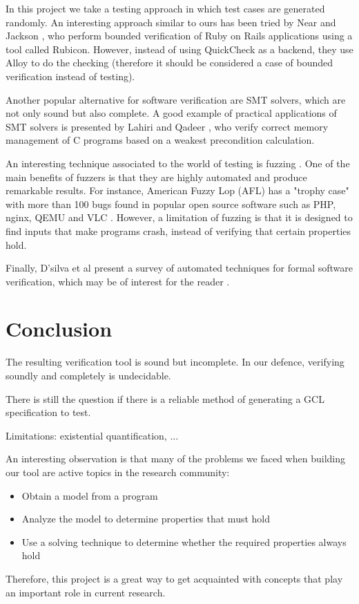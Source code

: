 \documentclass[a4paper]{article}
\begin{document}
In this project we take a testing approach in which test cases are generated
randomly. An interesting approach similar to ours has been tried by Near and Jackson
\cite{rubicon}, who perform bounded verification of Ruby on Rails applications
using a tool called Rubicon. However, instead of using QuickCheck as a backend,
they use Alloy to do the checking \cite{alloy} (therefore it should be considered
a case of bounded verification instead of testing).

Another popular alternative for software verification are SMT solvers, which are
not only sound but also complete. A good example of practical applications of
SMT solvers is presented by Lahiri and Qadeer \cite{Lahiri}, who verify correct
memory management of C programs based on a weakest precondition calculation.

An interesting technique associated to the world of testing is fuzzing \cite{takanen2008fuzzing}.
One of the main benefits of fuzzers is that they are highly automated and
produce remarkable results. For instance, American Fuzzy Lop (AFL) has a "trophy case"
with more than 100 bugs found in popular open source software such as PHP, nginx, QEMU
and VLC \cite{afl}. However, a limitation of fuzzing is that it is designed to find
inputs that make programs crash, instead of verifying that certain properties hold.

Finally, D'silva et al present a survey of automated techniques for formal software
verification, which may be of interest for the reader \cite{d2008survey}.

\section{Conclusion}

The resulting verification tool is sound but incomplete. In our defence,
verifying soundly and completely is undecidable.

There is still the question if there is a reliable method of generating a GCL
specification to test.

Limitations: existential quantification, ...

An interesting observation is that many of the problems we faced when building
our tool are active topics in the research community:

\begin{itemize}
\item Obtain a model from a program
\item Analyze the model to determine properties that must hold
\item Use a solving technique to determine whether the required properties always hold
\end{itemize}

Therefore, this project is a great way to get acquainted with concepts that play
an important role in current research.



\end{document}
